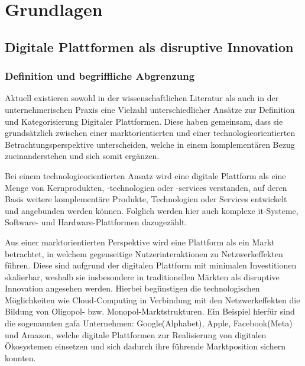 \chapter{Grundlagen}

\section{Digitale Plattformen als disruptive Innovation}

\subsection{Definition und begriffliche Abgrenzung}

Aktuell existieren sowohl in der wissenschaftlichen Literatur als auch in der unternehmerischen Praxis eine Vielzahl unterschiedlicher Ansätze zur Definition und Kategorisierung Digitaler Plattformen. Diese haben gemeinsam, dass sie grundsätzlich zwischen einer marktorientierten und einer technologieorientierten Betrachtungsperspektive unterscheiden, welche in einem komplementären Bezug zueinanderstehen und sich somit ergänzen. \autocite[Vgl.][S. 21-23]{ENGELS2017} \autocite[Vgl.][S.99]{MEINHARDT2019}

Bei einem technologieorientierten Ansatz wird eine digitale Plattform als eine Menge von Kernprodukten, -technologien oder -services verstanden, auf deren Basis weitere komplementäre Produkte, Technologien oder Services entwickelt und angebunden werden können. \autocite[Vgl.][S. 21]{ENGELS2017} Folglich werden hier auch komplexe \ac{it}-Systeme, Software- und Hardware-Plattformen dazugezählt.\autocite[Vgl.][S.222f]{WEINREICH2016}

Aus einer marktorientierten Perspektive wird eine Plattform als ein Markt betrachtet, in welchem gegenseitige Nutzerinteraktionen zu Netzwerkeffekten führen. \autocite[Vgl.][S. 1273f]{EISENMANN2011} Diese sind aufgrund der digitalen Plattform mit minimalen Investitionen skalierbar, weshalb sie insbesondere in traditionellen Märkten als disruptive Innovation angesehen werden. \autocite[Vgl.][S. 17ff]{MOAZED2016} Hierbei begünstigen die technologischen Möglichkeiten wie Cloud-Computing in Verbindung mit den Netzwerkeffekten die Bildung von Oligopol- bzw. Monopol-Marktstrukturen.\autocite[Vgl.][S. 23]{ENGELS2017} Ein Beispiel hierfür sind die sogenannten \acs{gafa} Unternehmen: Google(Alphabet), Apple, Facebook(Meta) und Amazon, welche digitale Plattformen zur Realisierung von digitalen Ökosystemen einsetzen und sich dadurch ihre führende Marktposition sichern konnten. \autocite[Vgl.][S. 92f]{BUNTE2020} 

